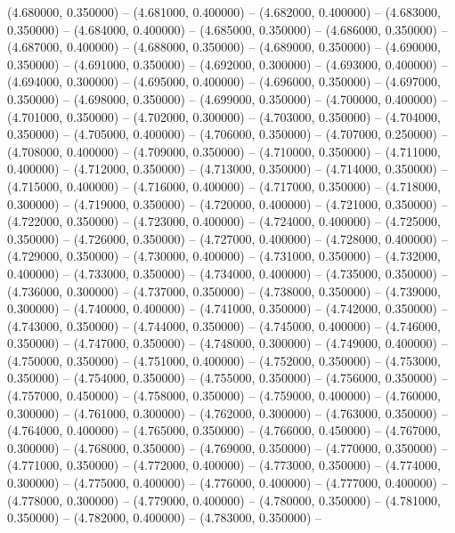 (4.680000, 0.350000) -- 
(4.681000, 0.400000) -- 
(4.682000, 0.400000) -- 
(4.683000, 0.350000) -- 
(4.684000, 0.400000) -- 
(4.685000, 0.350000) -- 
(4.686000, 0.350000) -- 
(4.687000, 0.400000) -- 
(4.688000, 0.350000) -- 
(4.689000, 0.350000) -- 
(4.690000, 0.350000) -- 
(4.691000, 0.350000) -- 
(4.692000, 0.300000) -- 
(4.693000, 0.400000) -- 
(4.694000, 0.300000) -- 
(4.695000, 0.400000) -- 
(4.696000, 0.350000) -- 
(4.697000, 0.350000) -- 
(4.698000, 0.350000) -- 
(4.699000, 0.350000) -- 
(4.700000, 0.400000) -- 
(4.701000, 0.350000) -- 
(4.702000, 0.300000) -- 
(4.703000, 0.350000) -- 
(4.704000, 0.350000) -- 
(4.705000, 0.400000) -- 
(4.706000, 0.350000) -- 
(4.707000, 0.250000) -- 
(4.708000, 0.400000) -- 
(4.709000, 0.350000) -- 
(4.710000, 0.350000) -- 
(4.711000, 0.400000) -- 
(4.712000, 0.350000) -- 
(4.713000, 0.350000) -- 
(4.714000, 0.350000) -- 
(4.715000, 0.400000) -- 
(4.716000, 0.400000) -- 
(4.717000, 0.350000) -- 
(4.718000, 0.300000) -- 
(4.719000, 0.350000) -- 
(4.720000, 0.400000) -- 
(4.721000, 0.350000) -- 
(4.722000, 0.350000) -- 
(4.723000, 0.400000) -- 
(4.724000, 0.400000) -- 
(4.725000, 0.350000) -- 
(4.726000, 0.350000) -- 
(4.727000, 0.400000) -- 
(4.728000, 0.400000) -- 
(4.729000, 0.350000) -- 
(4.730000, 0.400000) -- 
(4.731000, 0.350000) -- 
(4.732000, 0.400000) -- 
(4.733000, 0.350000) -- 
(4.734000, 0.400000) -- 
(4.735000, 0.350000) -- 
(4.736000, 0.300000) -- 
(4.737000, 0.350000) -- 
(4.738000, 0.350000) -- 
(4.739000, 0.300000) -- 
(4.740000, 0.400000) -- 
(4.741000, 0.350000) -- 
(4.742000, 0.350000) -- 
(4.743000, 0.350000) -- 
(4.744000, 0.350000) -- 
(4.745000, 0.400000) -- 
(4.746000, 0.350000) -- 
(4.747000, 0.350000) -- 
(4.748000, 0.300000) -- 
(4.749000, 0.400000) -- 
(4.750000, 0.350000) -- 
(4.751000, 0.400000) -- 
(4.752000, 0.350000) -- 
(4.753000, 0.350000) -- 
(4.754000, 0.350000) -- 
(4.755000, 0.350000) -- 
(4.756000, 0.350000) -- 
(4.757000, 0.450000) -- 
(4.758000, 0.350000) -- 
(4.759000, 0.400000) -- 
(4.760000, 0.300000) -- 
(4.761000, 0.300000) -- 
(4.762000, 0.300000) -- 
(4.763000, 0.350000) -- 
(4.764000, 0.400000) -- 
(4.765000, 0.350000) -- 
(4.766000, 0.450000) -- 
(4.767000, 0.300000) -- 
(4.768000, 0.350000) -- 
(4.769000, 0.350000) -- 
(4.770000, 0.350000) -- 
(4.771000, 0.350000) -- 
(4.772000, 0.400000) -- 
(4.773000, 0.350000) -- 
(4.774000, 0.300000) -- 
(4.775000, 0.400000) -- 
(4.776000, 0.400000) -- 
(4.777000, 0.400000) -- 
(4.778000, 0.300000) -- 
(4.779000, 0.400000) -- 
(4.780000, 0.350000) -- 
(4.781000, 0.350000) -- 
(4.782000, 0.400000) -- 
(4.783000, 0.350000) -- 
